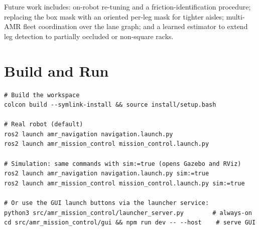 \documentclass[11pt,a4paper]{article}
\begin{document}
Future work includes: on-robot re-tuning and a friction-identification
procedure; replacing the box mask with an oriented per-leg mask for tighter
aisles; multi-AMR fleet coordination over the lane graph; and a learned
estimator to extend leg detection to partially occluded or non-square racks.

\appendix
\section{Build and Run}
\begin{lstlisting}[language={},numbers=none,basicstyle=\ttfamily\scriptsize]
# Build the workspace
colcon build --symlink-install && source install/setup.bash

# Real robot (default)
ros2 launch amr_navigation navigation.launch.py
ros2 launch amr_mission_control mission_control.launch.py

# Simulation: same commands with sim:=true (opens Gazebo and RViz)
ros2 launch amr_navigation navigation.launch.py sim:=true
ros2 launch amr_mission_control mission_control.launch.py sim:=true

# Or use the GUI launch buttons via the launcher service:
python3 src/amr_mission_control/launcher_server.py        # always-on
cd src/amr_mission_control/gui && npm run dev -- --host    # serve GUI
\end{lstlisting}
\end{document}
